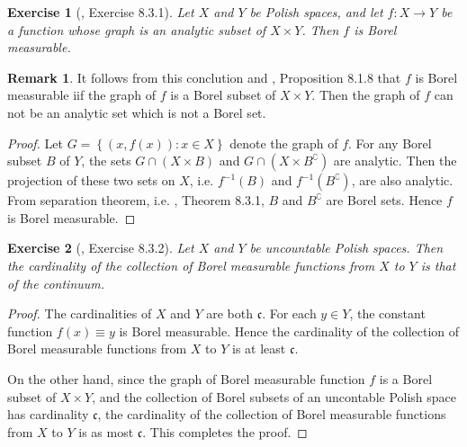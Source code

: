 \documentclass[11pt]{article}
\theoremstyle{plain}
\newtheorem{exercise}{Exercise}
\theoremstyle{definition}
\newtheorem{remark}{Remark}
\theoremstyle{remark}
\begin{document}
\begin{exercise}[\cite{book:992991}, Exercise 8.3.1]
    Let $X$ and $Y$ be Polish spaces, and let $f: X \to Y$ be a function whose graph is an analytic subset of $X \times Y$.
    Then $f$ is Borel measurable.
\end{exercise}
\begin{remark}
    It follows from this conclution and \cite{book:992991}, Proposition 8.1.8 that $f$ is Borel measurable iif the graph of $f$ is a Borel subset of $X\times Y$.
    Then the graph of $f$ can not be an analytic set which is not a Borel set.

\end{remark}
\begin{proof}
    Let $G= \left\{ (x,f(x)): x\in X \right\}$ denote the graph of $f$.
    For any Borel subset $B$ of $Y$, the sets $G \cap (X \times B)$ and $G \cap (X \times B^\complement)$ are analytic.
    Then the projection of these two sets on $X$, i.e. $f^{-1}(B)$ and $f^{-1}(B^\complement)$, are also analytic.
    From separation theorem, i.e. \cite{book:992991}, Theorem 8.3.1, $B$ and $B^\complement$ are Borel sets.
    Hence $f$ is Borel measurable.
\end{proof}

\begin{exercise}[\cite{book:992991}, Exercise 8.3.2]
Let $X$ and $Y$ be uncountable Polish spaces.
Then the cardinality of the collection of Borel measurable functions from $X$ to $Y$ is that of the continuum.
\end{exercise}
\begin{proof}
    The cardinalities of $X$ and $Y$ are both $\mathfrak c$.
    For each $y \in Y$, the constant function $f(x) \equiv y$ is Borel measurable.
    Hence the cardinality of the collection of Borel measurable functions from $X$ to $Y$ is at least $\mathfrak c$.

    On the other hand, since the graph of Borel measurable function $f$ is a Borel subset of $X\times Y$, and the collection of Borel subsets of an uncontable Polish space has cardinality $\mathfrak c$, the cardinality of the collection of Borel measurable functions from $X$ to $Y$ is as most $\mathfrak c$.
    This completes the proof.
\end{proof}
\end{document}
